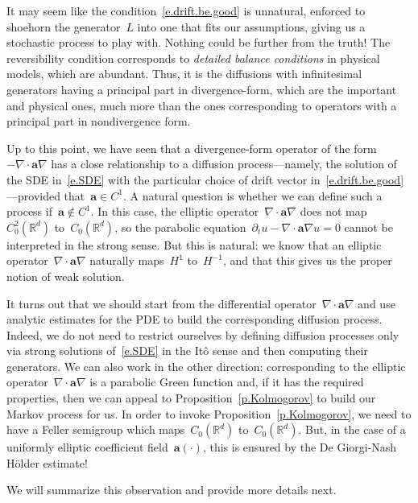 \documentclass[11pt,twoside]{article} %
\numberwithin{equation}{section}
\theoremstyle{definition}
\newcommand*{\Rd}{\ensuremath{\mathbb{R}^d}}
\renewcommand{\a}{\mathbf{a}}
\begin{document}
\smallskip

It may seem like the condition~\eqref{e.drift.be.good} is unnatural, enforced to shoehorn the generator~$L$ into one that fits our assumptions, giving us a stochastic process to play with. Nothing could be further from the truth! The reversibility condition corresponds to \emph{detailed balance conditions} in physical models, which are abundant. Thus, it is the diffusions with infinitesimal generators having a principal part in divergence-form, which are the important and physical ones, much more than the ones corresponding to operators with a principal part in nondivergence form. 

\smallskip

Up to this point, we have seen that a divergence-form operator of the form~$-\nabla \cdot \a\nabla$ has a close relationship to a diffusion process---namely, the solution of the SDE in~\eqref{e.SDE} with the particular choice of drift vector in~\eqref{e.drift.be.good}---provided that~$\a \in C^1$. A natural question is whether we can define such a process if~$\a\not\in C^1$. In this case, the elliptic operator~$\nabla \cdot \a\nabla$ does not map~$C^2_0(\Rd)$ to~$C_0(\Rd)$, so the parabolic equation~$\partial_t u - \nabla\cdot \a\nabla u = 0$ cannot be interpreted in the strong sense. But this is natural: we know that an elliptic operator~$\nabla \cdot \a\nabla$ naturally maps~$H^1$ to~$H^{-1}$, and that this gives us the proper notion of weak solution. 

\smallskip

It turns out that we should start from the differential operator~$\nabla \cdot\a\nabla$ and use analytic estimates for the PDE to build the corresponding diffusion process. Indeed, we do not need to restrict ourselves by defining diffusion processes only via strong solutions of~\eqref{e.SDE} in the It\^o sense and then computing their generators. We can also work in the other direction: corresponding to the elliptic operator~$\nabla \cdot \a\nabla$ is a parabolic Green function and, if it has the required properties, then we can appeal to Proposition~\ref{p.Kolmogorov} to build our Markov process for us. In order to invoke Proposition~\ref{p.Kolmogorov}, we need to have a Feller semigroup which maps~$C_0(\Rd)$ to~$C_0(\Rd)$. But, in the case of a uniformly elliptic coefficient field~$\a(\cdot)$, this is ensured by the De Giorgi-Nash H\"older estimate! 

\smallskip

We will summarize this observation and provide more details next. 
\end{document}
